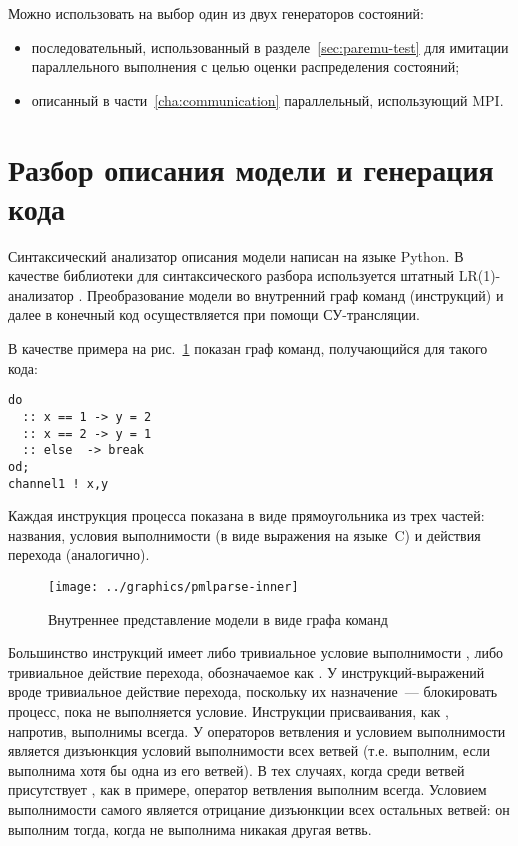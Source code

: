 Можно использовать на выбор один из двух генераторов состояний: 

\begin{itemize}
\item последовательный, использованный в разделе~\ref{sec:paremu-test} для имитации параллельного
  выполнения с целью оценки распределения состояний;
\item описанный в части~\ref{cha:communication} параллельный, использующий MPI.
\end{itemize}

\section{Разбор описания модели и генерация кода}
\label{sec:promela-parser}

Синтаксический анализатор описания модели написан на языке Python. В качестве библиотеки
для синтаксического разбора используется штатный LR(1)-анализатор
. Преобразование модели во внутренний граф команд (инструкций) и далее в
конечный код осуществляется при помощи СУ-трансляции.

В качестве примера на рис.~\ref{fig:pmlparse-inner} показан граф команд, получающийся для
такого кода:
\begin{lstlisting}[language=Promela]
do
  :: x == 1 -> y = 2
  :: x == 2 -> y = 1
  :: else  -> break
od;
channel1 ! x,y
\end{lstlisting}

Каждая инструкция процесса показана в виде прямоугольника из трех частей: названия,
условия выполнимости  (в виде выражения на языке~C) и действия перехода
 (аналогично). 

\begin{figure}[ht]
  \centering
  \texttt{[image: ../graphics/pmlparse-inner]}
  \caption{Внутреннее представление модели в виде графа команд}
  \label{fig:pmlparse-inner}
\end{figure}

Большинство инструкций имеет либо тривиальное условие выполнимости , либо
тривиальное действие перехода, обозначаемое как . У инструкций-выражений вроде
 тривиальное действие перехода, поскольку их назначение~--- блокировать
процесс, пока не выполняется условие. Инструкции присваивания, как , напротив,
выполнимы всегда. У операторов ветвления  и  условием выполнимости
является дизъюнкция условий выполнимости всех ветвей (т.е.  выполним, если
выполнима хотя бы одна из его ветвей). В тех случаях, когда среди ветвей присутствует
, как в примере, оператор ветвления выполним всегда. Условием выполнимости
самого  является отрицание дизъюнкции всех остальных ветвей: он выполним тогда,
когда не выполнима никакая другая ветвь.  

